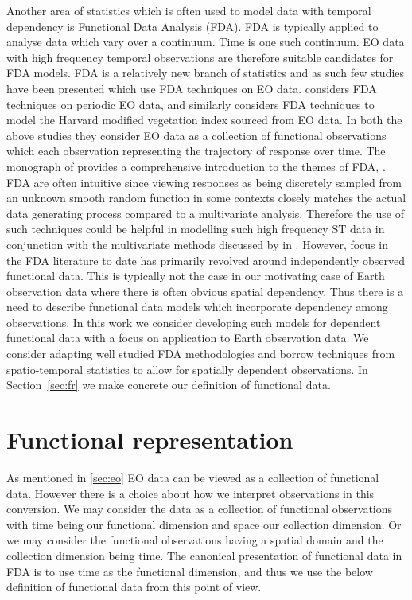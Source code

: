 Another area of statistics which is often used to model data with temporal dependency is Functional Data Analysis (FDA).
FDA is typically applied to analyse data which vary over a continuum.
Time is one such continuum.
EO data with high frequency temporal observations are therefore suitable candidates for FDA models.
FDA is a relatively new branch of statistics and as such few studies have been presented which use FDA techniques on EO data.
\citeauthor{liu_functional_2012} considers FDA techniques on periodic EO data, \citep{liu_functional_2012} and similarly \citeauthor{hooker_maximal_2015} considers FDA techniques to model the Harvard modified vegetation index sourced from EO data.
In both the above studies they consider EO data as a collection of functional observations which each observation representing the trajectory of response over time.
The monograph of \citeauthor{ramsay_functional_2010} provides a comprehensive introduction to the themes of FDA, \citep{ramsay_functional_2010}.
FDA are often intuitive since viewing responses as being discretely sampled from an unknown smooth random function in some contexts closely matches the actual data generating process compared to a multivariate analysis.
Therefore the use of such techniques could be helpful in modelling such high frequency ST data in conjunction with the multivariate methods discussed by \citeauthor{cressie_statistics_2011} in \citep{cressie_statistics_2011}.
However, focus in the FDA literature to date has primarily revolved around independently observed functional data.
This is typically not the case in our motivating case of Earth observation data where there is often obvious spatial dependency.
Thus there is a need to describe functional data models which incorporate dependency among observations.
In this work we consider developing such models for dependent functional data with a focus on application to Earth observation data.
We consider adapting well studied FDA methodologies and borrow techniques from spatio-temporal statistics to allow for spatially dependent observations.
In Section~\ref{sec:fr} we make concrete our definition of functional data. 

\section{Functional representation \label{sec:fr}}
As mentioned in \ref{sec:eo} EO data can be viewed as a collection of functional data.
However there is a choice about how we interpret observations in this conversion.
We may consider the data as a collection of functional observations with time being our functional dimension and space our collection dimension.
Or we may consider the functional observations having a spatial domain and the collection dimension being time.
The canonical presentation of functional data in FDA is to use time as the functional dimension, \citep{ramsay_functional_2010} and thus we use the below definition of functional data from this point of view. 

